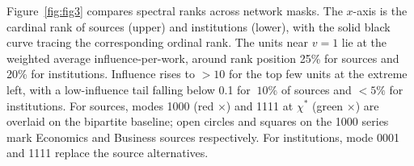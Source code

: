 
Figure~\ref{fig:fig3} compares spectral ranks across network masks. The $x$-axis is the cardinal rank of sources (upper) and institutions (lower), with the solid black curve tracing the corresponding ordinal rank. The units near $v=1$ lie at the weighted average influence-per-work, around rank position 25\% for sources and 20\% for institutions. Influence rises to $> 10$ for the top few units at the extreme left, with a low-influence tail falling below 0.1 for $~ 10\%$ of sources and $< 5\%$ for institutions.
For sources, modes 1000 (red $\times$) and 1111 at $\chi^*$ (green $\times$)
are overlaid on the bipartite baseline; open circles and squares on the
1000 series mark Economics and Business sources respectively.
For institutions, mode 0001 and 1111 replace the source alternatives.

